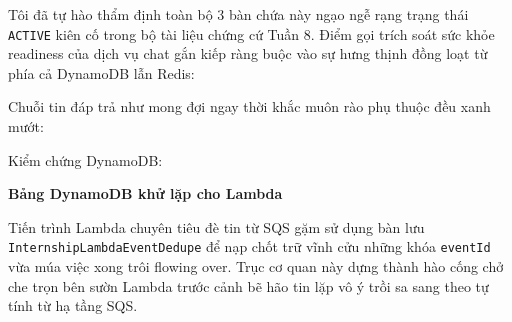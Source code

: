 Tôi đã tự hào thẩm định toàn bộ 3 bàn chứa này ngạo ngễ rạng trạng thái
\texttt{ACTIVE} kiên cố trong bộ tài liệu chứng cứ Tuần 8. Điểm gọi
trích soát sức khỏe readiness của dịch vụ chat gắn kiếp ràng buộc vào sự
hưng thịnh đồng loạt từ phía cả DynamoDB lẫn Redis:

\begin{Shaded}
\begin{Highlighting}[]
 
\end{Highlighting}
\end{Shaded}

Chuỗi tin đáp trả như mong đợi ngay thời khắc muôn rào phụ thuộc đều
xanh mướt:

\begin{Shaded}
\begin{Highlighting}[]
\FunctionTok{\{}\FunctionTok{:}\FunctionTok{,}\FunctionTok{:\{}\FunctionTok{:}\FunctionTok{,}\FunctionTok{:}\FunctionTok{\}\}}
\end{Highlighting}
\end{Shaded}

Kiểm chứng DynamoDB:

\begin{Shaded}
\begin{Highlighting}[]
\end{Highlighting}
\end{Shaded}

\vspace{0.5em}\noindent\textbf{Bảng DynamoDB khử lặp cho
Lambda}\par

Tiến trình Lambda chuyên tiêu đè tin từ SQS gặm sử dụng bàn lưu
\texttt{InternshipLambdaEventDedupe} để nạp chốt trữ vĩnh cửu những khóa
\texttt{eventId} vừa múa việc xong trôi flowing over. Trục cơ quan này
dựng thành hào cống chở che trọn bên sườn Lambda trước cảnh bẽ hão tin
lặp vô ý trồi sa sang theo tự tính từ hạ tầng SQS.

